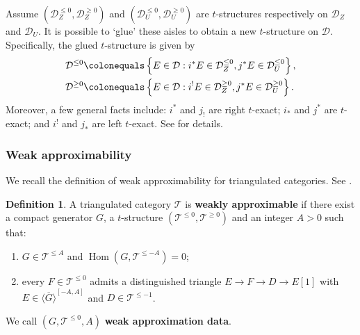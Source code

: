 \documentclass[11pt]{amsart}
\theoremstyle{plain}
\theoremstyle{definition}
\newtheorem{definition}[theorem]{Definition}
\numberwithin{equation}{section}
\numberwithin{theorem}{section}
\begin{document}
Assume $(\mathcal{D}_Z^{\leq 0}, \mathcal{D}_Z^{\geq 0})$ and $(\mathcal{D}_U^{\leq 0}, \mathcal{D}_U^{\geq 0})$ are $t$-structures respectively on $\mathcal{D}_Z$ and $\mathcal{D}_U$. 
It is possible to `glue' these aisles to obtain a new $t$-structure on $\mathcal{D}$. 
Specifically, the glued $t$-structure is given by 
\begin{displaymath}
    \begin{aligned}
        \mathcal{D}^{\leq 0} &\colonequals  \left\{ E\in \mathcal{D} : i^\ast E \in \mathcal{D}_Z^{\leq 0}, j^\ast E \in \mathcal{D}_U^{\leq 0} \right\},
        \\ \mathcal{D}^{\geq 0} &\colonequals  \left\{ E\in \mathcal{D} : i^! E \in \mathcal{D}_Z^{\geq 0}, j^\ast E \in \mathcal{D}_U^{\geq 0} \right\}.
    \end{aligned}
\end{displaymath}
Moreover, a few general facts include: $i^\ast$ and $j_!$ are right $t$-exact;  $i_\ast$ and $j^\ast$ are $t$-exact; and $i^!$ and $j_\ast$ are left $t$-exact.
See \cite[1.4.10 \& 1.3.17.(iii)]{Beilinson/Berstein/Deligne/Gabber:2018} for details.

\subsubsection{Weak approximability}
\label{sec:prelim_weak_approx}

We recall the definition of weak approximability for triangulated categories.
See \cite[Definition 1.25]{Neeman:2026}.

\begin{definition}
    \label{def:weak_approx}
    A triangulated category $\mathcal{T}$ is \textbf{weakly approximable} if there exist a compact generator $G$, a $t$-structure $(\mathcal{T}^{\leq 0},\mathcal{T}^{\geq 0})$ and an integer $A>0$ such that:
    \begin{enumerate}
        \item \label{def:weak_approx1} $G\in \mathcal{T}^{\leq A}$ and $\operatorname{Hom}(G,\mathcal{T}^{\leq -A})=0$;
        \item \label{def:weak_approx2} every $F\in \mathcal{T}^{\leq 0}$ admits a distinguished triangle $E\to F\to D\to E[1]$ with $E\in \overline{\langle G\rangle}^{[-A,A]}$ and $D\in \mathcal{T}^{\leq -1}$.
    \end{enumerate}
    We call $(G,\mathcal{T}^{\leq 0},A)$ \textbf{weak approximation data}.
\end{definition}
\end{document}
